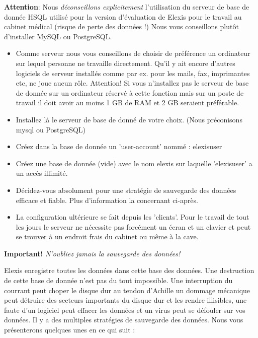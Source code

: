 \textbf{Attention}: Nous \textit{déconseillons explicitement} l'utilisation du serveur de base de donnée HSQL utilisé pour la version d'évaluation de Elexis pour le travail au cabinet médical (risque de perte des données !) Nous vous conseillons plutôt d'installer MySQL ou PostgreSQL.
\begin{itemize}
 \item Comme serveur nous vous conseillons de choisir de préférence un ordinateur sur lequel personne ne travaille directement. Qu'il y ait encore d'autres logiciels de serveur installés comme par ex. pour les mails, fax, imprimantes etc, ne joue aucun rôle. Attention! Si vous n'installez pas le serveur de base de donnée sur un ordinateur réservé à cette fonction mais sur un poste de travail il doit avoir au moins 1 GB de RAM et 2 GB seraient préférable.
 \item Installez là le serveur de base de donné de votre choix. (Nous préconisons mysql ou PostgreSQL)
 \item Créez dans la base de donnée un 'user-account' nommé : elexisuser
 \item Créez une base de donnée (vide) avec le nom elexis sur laquelle 'elexisuser' a un accès illimité.
 \item Décidez-vous absolument pour une stratégie de sauvegarde des données efficace et fiable. Plus d'information la concernant ci-après.
 \item La configuration ultérieure se fait depuis les 'clients'. Pour le travail de tout les jours le serveur ne nécessite pas forcément un écran et un clavier et peut se trouver à un endroit frais du cabinet ou même à la cave.
\end{itemize}

\textbf{Important!}
\textit{N'oubliez jamais la sauvegarde des données!}

Elexis enregistre toutes les données dans cette base des données. Une destruction de cette base de donnée n'est pas du tout impossible. Une interruption du courrant peut \glqq  choper le disque dur au tendon d'Achille\grqq{} un dommage mécanique peut détruire des secteurs importants du disque dur et les rendre illisibles, une faute d'un logiciel peut effacer les données et un virus peut se défouler sur vos données. Il y a des multiples stratégies de sauvegarde des données. Nous vous présenterons quelques unes en ce qui suit :

